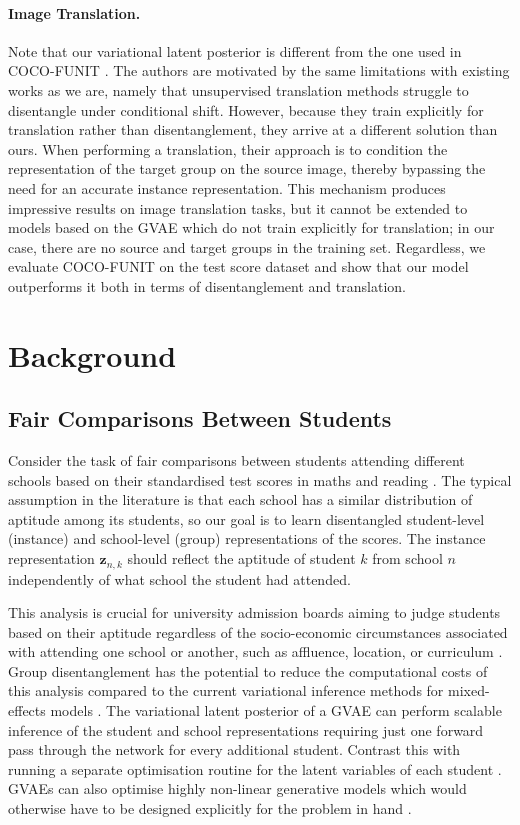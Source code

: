 \documentclass{article} %
\begin{document}
\paragraph{Image Translation.} Note that our variational latent posterior is different from the one used in COCO-FUNIT \citep{Saito2020Coco}. The authors are motivated by the same limitations with existing works as we are, namely that unsupervised translation methods struggle to disentangle under conditional shift. However, because they train explicitly for translation rather than disentanglement, they arrive at a different solution than ours. When performing a translation, their approach is to condition the representation of the target group on the source image, thereby bypassing the need for an accurate instance representation. This mechanism produces impressive results on image translation tasks, but it cannot be extended to models based on the GVAE which do not train explicitly for translation; in our case, there are no source and target groups in the training set. Regardless, we evaluate COCO-FUNIT on the test score dataset and show that our model outperforms it both in terms of disentanglement and translation.

\section{Background}

\subsection{Fair Comparisons Between Students}

Consider the task of fair comparisons between students attending different schools based on their standardised test scores in maths and reading \citep{Braun2006ComparingPS}. The typical assumption in the literature is that each school has a similar distribution of aptitude among its students, so our goal is to learn disentangled student-level (instance) and school-level (group) representations of the scores. The instance representation $\mathbf{z}_{n,k}$ should reflect the aptitude of student $k$ from school $n$ independently of what school the student had attended.

This analysis is crucial for university admission boards aiming to judge students based on their aptitude regardless of the socio-economic circumstances associated with attending one school or another, such as affluence, location, or curriculum \citep{Raudenbush1995TheEO, Braun2006ComparingPS}. Group disentanglement has the potential to reduce the computational costs of this analysis compared to the current variational inference methods for mixed-effects models \citep{Gelman2006Data}. The variational latent posterior of a GVAE can perform scalable inference of the student and school representations requiring just one forward pass through the network for every additional student. Contrast this with running a separate optimisation routine for the latent variables of each student \citep{Gelman1995BayesianDA}. GVAEs can also optimise highly non-linear generative models which would otherwise have to be designed explicitly for the problem in hand \citep{Pinheiro2001MixedEffectsMI}.
\end{document}

